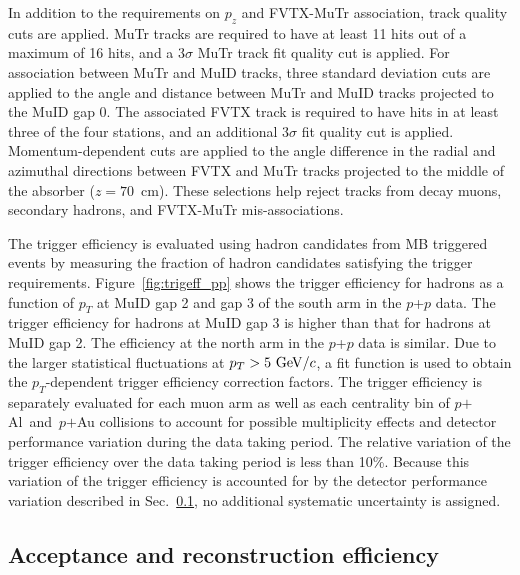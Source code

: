 \documentclass[twocolumn,letterpaper,aps,prc,longbibliography,superscriptaddress,nofootinbib,floatfix]{revtex4-2}
\newcommand{\pt}{\mbox{$p_T$}\xspace}
\newcommand{\pz}{\mbox{$p_z$}\xspace}
\newcommand{\pp}{\mbox{$p$+$p$}\xspace}
\newcommand{\palau}{\mbox{$p$$+$Al and $p$$+$Au}\xspace}
\begin{document}
In addition to the requirements on \pz and FVTX-MuTr association, track 
quality cuts are applied. MuTr tracks are required to have at least 11 
hits out of a maximum of 16 hits, and a 3$\sigma$ MuTr track fit quality 
cut is applied. For association between MuTr and MuID tracks, three 
standard deviation cuts are applied to the angle and distance between 
MuTr and MuID tracks projected to the MuID gap 0. The associated FVTX 
track is required to have hits in at least three of the four stations, 
and an additional 3$\sigma$ fit quality cut is applied. 
Momentum-dependent cuts are applied to the angle difference in the 
radial and azimuthal directions between FVTX and MuTr tracks projected 
to the middle of the absorber ($z=70$~cm).  These selections help reject 
tracks from decay muons, secondary hadrons, and FVTX-MuTr 
mis-associations.

The trigger efficiency is evaluated using hadron candidates from MB 
triggered events by measuring the fraction of hadron candidates 
satisfying the trigger requirements. Figure~\ref{fig:trigeff_pp} shows 
the trigger efficiency for hadrons as a function of \pt at MuID gap 2 
and gap 3 of the south arm in the \pp data.  The trigger efficiency for 
hadrons at MuID gap 3 is higher than that for hadrons at MuID gap 2. The 
efficiency at the north arm in the \pp data is similar. Due to the 
larger statistical fluctuations at $\pt>5~{\rm GeV}/c$, a fit function 
is used to obtain the \pt-dependent trigger efficiency correction 
factors. The trigger efficiency is separately evaluated for each muon 
arm as well as each centrality bin of \palau collisions to account for 
possible multiplicity effects and detector performance variation during 
the data taking period.  The relative variation of the trigger 
efficiency over the data taking period is less than 10\%. Because this 
variation of the trigger efficiency is accounted for by the detector 
performance variation described in Sec.~\ref{sec:acceff}, no additional 
systematic uncertainty is assigned.

\subsection{Acceptance and reconstruction efficiency}
\label{sec:acceff}
\end{document}
